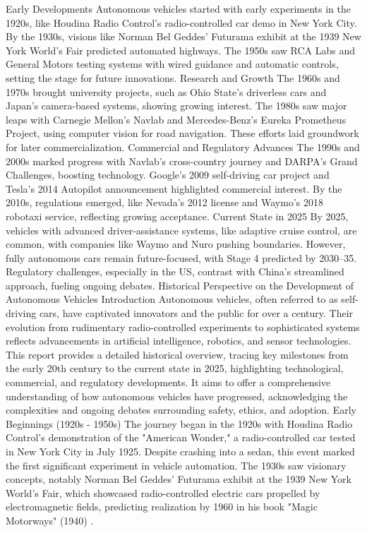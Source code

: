 Early Developments
Autonomous vehicles started with early experiments in the 1920s, like Houdina Radio Control's radio-controlled car demo in New York City. By the 1930s, visions like Norman Bel Geddes' Futurama exhibit at the 1939 New York World's Fair predicted automated highways. The 1950s saw RCA Labs and General Motors testing systems with wired guidance and automatic controls, setting the stage for future innovations.
Research and Growth
The 1960s and 1970s brought university projects, such as Ohio State’s driverless cars and Japan’s camera-based systems, showing growing interest. The 1980s saw major leaps with Carnegie Mellon’s Navlab and Mercedes-Benz’s Eureka Prometheus Project, using computer vision for road navigation. These efforts laid groundwork for later commercialization.
Commercial and Regulatory Advances
The 1990s and 2000s marked progress with Navlab’s cross-country journey and DARPA’s Grand Challenges, boosting technology. Google’s 2009 self-driving car project and Tesla’s 2014 Autopilot announcement highlighted commercial interest. By the 2010s, regulations emerged, like Nevada’s 2012 license and Waymo’s 2018 robotaxi service, reflecting growing acceptance.
Current State in 2025
By 2025, vehicles with advanced driver-assistance systems, like adaptive cruise control, are common, with companies like Waymo and Nuro pushing boundaries. However, fully autonomous cars remain future-focused, with Stage 4 predicted by 2030–35. Regulatory challenges, especially in the US, contrast with China’s streamlined approach, fueling ongoing debates.
Historical Perspective on the Development of Autonomous Vehicles
Introduction
Autonomous vehicles, often referred to as self-driving cars, have captivated innovators and the public for over a century. Their evolution from rudimentary radio-controlled experiments to sophisticated systems reflects advancements in artificial intelligence, robotics, and sensor technologies. This report provides a detailed historical overview, tracing key milestones from the early 20th century to the current state in 2025, highlighting technological, commercial, and regulatory developments. It aims to offer a comprehensive understanding of how autonomous vehicles have progressed, acknowledging the complexities and ongoing debates surrounding safety, ethics, and adoption.
Early Beginnings (1920s - 1950s)
The journey began in the 1920s with Houdina Radio Control’s demonstration of the "American Wonder," a radio-controlled car tested in New York City in July 1925. Despite crashing into a sedan, this event marked the first significant experiment in vehicle automation. The 1930s saw visionary concepts, notably Norman Bel Geddes' Futurama exhibit at the 1939 New York World's Fair, which showcased radio-controlled electric cars propelled by electromagnetic fields, predicting realization by 1960 in his book "Magic Motorways" (1940) .
